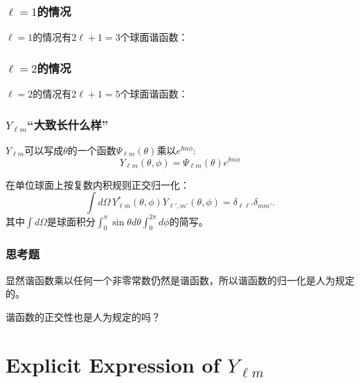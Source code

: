 \documentclass[CJK]{beamer}
\begin{document}
\begin{frame}
\frametitle{$\ell = 1$的情况}

$\ell = 1$的情况有$2\ell+1=3$个球面谐函数：


\end{frame}

\begin{frame}
\frametitle{$\ell = 2$的情况}

$\ell = 2$的情况有$2\ell+1=5$个球面谐函数：


\end{frame}


\begin{frame}
\frametitle{$Y_{\ell m}$“大致长什么样”}

\bitem
\item{$Y_{\ell m}$可以写成$\theta$的一个函数$\Psi_{\ell m}(\theta)$乘以$e^{\ii m\phi}$:
  {\blue $$Y_{\ell m}(\theta,\phi) = \Psi_{\ell m}(\theta)e^{\ii m\phi}$$}
}
\item{在单位球面上按复数内积规则正交归一化：
  {\blue $$\int d\Omega\,  Y_{\ell m}^*(\theta,\phi)Y_{\ell',m'}(\theta,\phi) = \delta_{\ell\ell'}\delta_{m m'} .$$}
  其中$\int d\Omega$是球面积分$\int_0^\pi \sin\theta d\theta\int_0^{2\pi}d\phi$的简写。
}  
  \eitem


\end{frame}


\begin{frame}
\frametitle{思考题}



显然谐函数乘以任何一个非零常数仍然是谐函数，所以谐函数的归一化是人为规定的。


谐函数的正交性也是人为规定的吗？


\end{frame}


\section{Explicit Expression of $Y_{\ell m}$}
\end{document}
